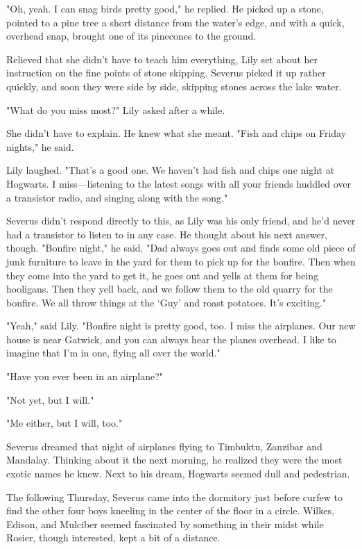 "Oh, yeah. I can snag birds pretty good," he replied. He picked up a stone, pointed to a pine tree a short distance from the water's edge, and with a quick, overhead snap, brought one of its pinecones to the ground.

Relieved that she didn't have to teach him everything, Lily set about her instruction on the fine points of stone skipping. Severus picked it up rather quickly, and soon they were side by side, skipping stones across the lake water.

"What do you miss most?" Lily asked after a while.

She didn't have to explain. He knew what she meant. "Fish and chips on Friday nights," he said.

Lily laughed. "That's a good one. We haven't had fish and chips one night at Hogwarts. I miss—listening to the latest songs with all your friends huddled over a transistor radio, and singing along with the song."

Severus didn't respond directly to this, as Lily was his only friend, and he'd never had a transistor to listen to in any case. He thought about his next answer, though. "Bonfire night," he said. "Dad always goes out and finds some old piece of junk furniture to leave in the yard for them to pick up for the bonfire. Then when they come into the yard to get it, he goes out and yells at them for being hooligans. Then they yell back, and we follow them to the old quarry for the bonfire. We all throw things at the `Guy' and roast potatoes. It's exciting."

"Yeah," said Lily. "Bonfire night is pretty good, too. I miss the airplanes. Our new house is near Gatwick, and you can always hear the planes overhead. I like to imagine that I'm in one, flying all over the world."

"Have you ever been in an airplane?"

"Not yet, but I will."

"Me either, but I will, too."

Severus dreamed that night of airplanes flying to Timbuktu, Zanzibar and Mandalay. Thinking about it the next morning, he realized they were the most exotic names he knew. Next to his dream, Hogwarts seemed dull and pedestrian.

The following Thursday, Severus came into the dormitory just before curfew to find the other four boys kneeling in the center of the floor in a circle. Wilkes, Edison, and Mulciber seemed fascinated by something in their midst while Rosier, though interested, kept a bit of a distance.

